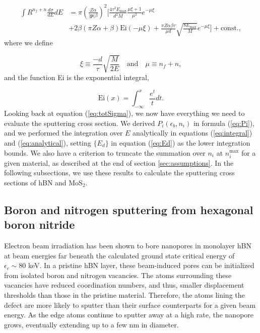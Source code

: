 \documentclass{article}
\begin{document}
\begin{equation}
  \begin{aligned}
    \int R^{n_f+n} \frac{d\sigma}{dE} dE
    &=
    \pi\left(\frac{Z\alpha}{|\mathbf{p}|\beta}\right)^2
    \bigg[
      \frac{4\tau^2 E_\text{max}}{d^2M} \frac{\mu\xi+1}{\mu^2} e^{-\mu\xi}
      \\&+
      2\beta(\pi Z\alpha+\beta)\text{Ei}(-\mu\xi)
      +
      \frac{\pi Z\alpha\beta\tau}{\mu d}\sqrt{\frac{8E_\text{max}}{M}}
      e^{-\mu\xi}
    \bigg]
    +\text{const}.,
  \end{aligned}
  \label{eq:analytical}
\end{equation}
%
where we define

\begin{equation}
  \xi \equiv \frac{-d}{\tau} \sqrt{\frac{M}{2E}}
  \quad\text{and}\quad
  \mu \equiv n_f + n,
  \label{eq:xi}
\end{equation}
%
and the function Ei is the exponential integral,

\begin{equation}
  \text{Ei}(x) = \int_{-\infty}^x \frac{e^t}{t}dt.
  \label{eq:Ei}
\end{equation}
%
Looking back at equation (\ref{eq:totSigma}), we now have everything we need to
evaluate the sputtering cross section.
We derived $P_i(\epsilon_b, n_i)$ in formula (\ref{eq:Pi}), and we performed
the integration over $E$ analytically in equations (\ref{eq:integral}) and
(\ref{eq:analytical}), setting $\{E_d\}$ in equation (\ref{eq:Ed}) as the lower
integration bounds.
We also have a criterion to truncate the summation over $n_i$ at
$n_i^\text{max}$ for a given material, as described at the end of section
\ref{sec:assumptions}.
In the following subsections, we use these results to calculate the sputtering
cross sections of hBN and MoS$_2$.


\subsection{Boron and nitrogen sputtering from hexagonal boron nitride}
\label{sec:hBN}

Electron beam irradiation has been shown to bore nanopores in monolayer hBN at
beam energies far beneath the calculated ground state critical energy of
$\epsilon_c\sim80$ keV.\cite{Jin2009,Meyer2009,Kotakoski2010,Cretu2015}
In a pristine hBN layer, these beam-induced pores can be initialized from
isolated boron and nitrogen vacancies.
The atoms surrounding these vacancies have reduced coordination numbers, and
thus, smaller displacement thresholds than those in the pristine material.
Therefore, the atoms lining the defect are more likely to sputter than their
surface counterparts for a given beam energy.
As the edge atoms continue to sputter away at a high rate, the nanopore grows,
eventually extending up to a few nm in diameter.
\cite{Meyer2009,Cretu2015,Dogan2020}
\end{document}
